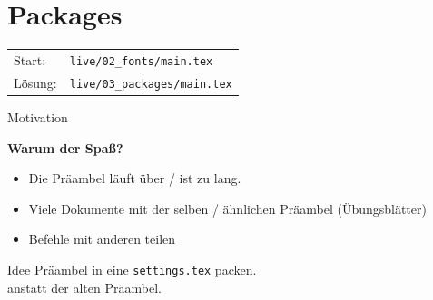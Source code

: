 \documentclass[14pt,aspectratio=169]{beamer}
\begin{document}


\section{Packages}
\begin{frame}
    \sectionpage
    \vspace{.5em}
    \begin{tabular}{ll}
        Start:  & \texttt{live/02_fonts/main.tex} \\
        Lösung: & \texttt{live/03_packages/main.tex} 
    \end{tabular}    
\end{frame}


\begin{frame}{\insertsection \quad\small Motivation}
	
	\textbf{Warum der Spaß?}
	
    \begin{itemize}
        \item Die Präambel läuft über / ist zu lang.
        \item Viele Dokumente mit der selben / ähnlichen Präambel (Übungsblätter)
        \item Befehle mit anderen teilen
    \end{itemize}
    
    \pause
    
    \begin{exampleblock}{Idee}
    	Präambel in eine \texttt{settings.tex} packen. \\
    	\texttt{} anstatt der alten Präambel.
    \end{exampleblock}
\end{frame}
\end{document}
